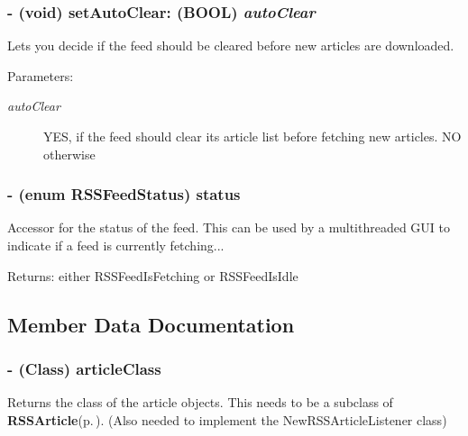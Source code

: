 \subsubsection{\setlength{\rightskip}{0pt plus 5cm}- (void) set\-Auto\-Clear: (BOOL) {\em auto\-Clear}}\label{classRSSFeed_2931b0bdee68292f638f0bc500e1662e}


Lets you decide if the feed should be cleared before new articles are downloaded.

\begin{Desc}
\item[Parameters:]
\begin{description}
\item[{\em auto\-Clear}]YES, if the feed should clear its article list before fetching new articles. NO otherwise \end{description}
\end{Desc}
\subsubsection{\setlength{\rightskip}{0pt plus 5cm}- (enum RSSFeed\-Status) status }\label{classRSSFeed_c44486e9314ab95c8d6b7a139df1cf24}


Accessor for the status of the feed. This can be used by a multithreaded GUI to indicate if a feed is currently fetching...

\begin{Desc}
\item[Returns:]either RSSFeed\-Is\-Fetching or RSSFeed\-Is\-Idle \end{Desc}


\subsection{Member Data Documentation}
\subsubsection{\setlength{\rightskip}{0pt plus 5cm}- (Class) {\bf article\-Class}\hspace{0.3cm}{\tt  [protected]}}\label{classRSSFeed_46d6ffae81a000ce1751557cec10a1d1}


Returns the class of the article objects. This needs to be a subclass of {\bf RSSArticle}{\rm (p.\,\pageref{interfaceRSSArticle})}. (Also needed to implement the New\-RSSArticle\-Listener class)


